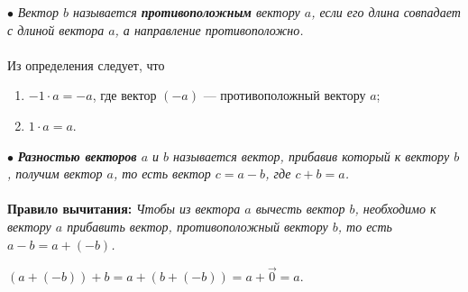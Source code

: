$\bullet$ \textit{Вектор $b$ называется \textbf{противоположным} вектору $a$, если его длина совпадает с длиной вектора $a$, а направление противоположно.}\\\\
Из определения следует, что\begin{enumerate}
	\item $-1\cdot a = -a$, где вектор $(-a)$ --- противоположный вектору $a$;
	\item $1\cdot a = a$.
\end{enumerate}
$\bullet$ \textit{\textbf{Разностью векторов} $a$ и $b$ называется вектор, прибавив который к вектору $b$, получим вектор $a$, то есть вектор $c = a-b$, где $c+b = a$.}\\\\
\textbf{Правило вычитания:} \textit{Чтобы из вектора $a$ вычесть вектор $b$, необходимо к вектору $a$ прибавить вектор, противоположный вектору $b$, то есть $a-b = a + (-b)$.}\\\begin{Proof}
	$(a+(-b)) + b = a + (b + (-b)) = a + \vec{0} = a$.
\end{Proof}



